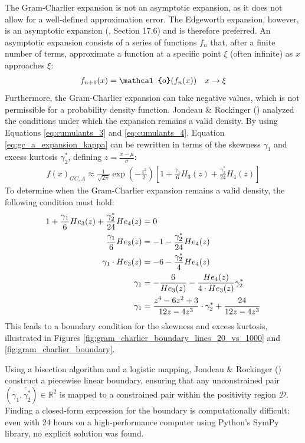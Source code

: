 The Gram-Charlier expansion is not an asymptotic expansion, as it does not allow for a well-defined approximation error. The Edgeworth expansion, however, is an asymptotic expansion (\cite{cramerMathematicalMethodsStatistics1999}, Section 17.6) and is therefore preferred. An asymptotic expansion consists of a series of functions $f_n$ that, after a finite number of terms, approximate a function at a specific point $\xi$ (often infinite) as $x$ approaches $\xi$:
\begin{align}
    f_{n+1}(x) = \mathcal{o}(f_n(x)) \quad x\to\xi \notag
\end{align}
Furthermore, the Gram-Charlier expansion can take negative values, which is not permissible for a probability density function. Jondeau \& Rockinger (\citeyear{jondeauGramCharlierDensities2001}) analyzed the conditions under which the expansion remains a valid density. By using Equations \eqref{eq:cumulants_3} and \eqref{eq:cumulants_4}, Equation \eqref{eq:gc_a_expansion_kappa} can be rewritten in terms of the skewness $\gamma_1$ and excess kurtosis $\gamma_2^*$, defining $z = \frac{x-\mu}{\sigma}$:
\begin{align}
    \label{eq:gc_a_expansion_s_ek}
    f(x)_{GC,A} \approx \frac{1}{\sqrt{2\pi}}\exp\left(-\frac{z^2}{2}\right) \left[1 + \frac{\gamma_1}{6}H_3(z) + \frac{\gamma_2^*}{24}H_4(z)\right]
\end{align}
To determine when the Gram-Charlier expansion remains a valid density, the following condition must hold:
\begin{align}
    1 + \frac{\gamma_1}{6}He_3(z) + \frac{\gamma_2^*}{24}He_4(z) &= 0 \notag \\
    \frac{\gamma_1}{6}He_3(z) &= -1 - \frac{\gamma_2^*}{24}He_4(z) \notag \\
    \gamma_1\cdot He_3(z) &= -6 - \frac{\gamma_2^*}{4}He_4(z) \notag \\
    \gamma_1 &= -\frac{6}{He_3(z)} - \frac{He_4(z)}{4\cdot He_3(z)}\gamma_2^* \notag \\
    \gamma_1 &= \frac{z^4-6z^2+3}{12z-4z^3}\cdot \gamma_2^* + \frac{24}{12z-4z^3} \notag
\end{align}
This leads to a boundary condition for the skewness and excess kurtosis, illustrated in Figures \ref{fig:gram_charlier_boundary_lines_20_vs_1000} and \ref{fig:gram_charlier_boundary}.

Using a bisection algorithm and a logistic mapping, Jondeau \& Rockinger (\citeyear{jondeauGramCharlierDensities2001}) construct a piecewise linear boundary, ensuring that any unconstrained pair $(\tilde{\gamma_1}, \tilde{\gamma_2^*}) \in \mathbb{R}^2$ is mapped to a constrained pair within the positivity region $\mathcal{D}$. Finding a closed-form expression for the boundary is computationally difficult; even with 24 hours on a high-performance computer using Python's SymPy library, no explicit solution was found.

